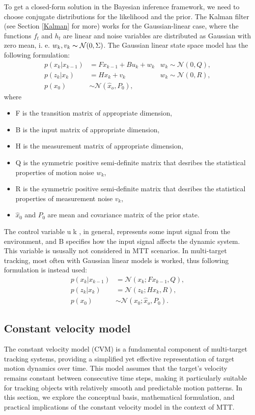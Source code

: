 To get a closed-form solution in the Bayesian inference framework, we need
to choose conjugate distributions for the likelihood and the prior. The Kalman filter (see Section \ref{Kalman} for
more) works for the Gaussian-linear case, where the functions
$f_t$ and $h_t$ are linear and noise variables are distributed as Gaussian with zero mean, i. e. $w_k, v_k  \thicksim \mathcal{N}(0,\Sigma)$. The Gaussian linear
state space model has the following formulation:
\begin{align}
    p(x_k|x_{k-1}) &= Fx_{k-1} + Bu_k + w_k
     &w_k \sim \mathcal{N}(0,Q),\\
    p(z_k|x_k) &= Hx_k + v_k
     &w_k \sim \mathcal{N}(0,R), \\
    p(x_0) &\sim \mathcal{N}(\hat{x}_o, P_0),
\end{align}
where
\begin{itemize}
    \item F is the transition matrix of appropriate dimension,
    \item B is the input matrix of appropriate dimension,
    \item H is the measurement matrix of appropriate dimension,
    \item Q is the symmetric positive semi-definite matrix that desribes the statistical properties of motion noise $
    w_k$,
    \item R is the symmetric positive semi-definite matrix that desribes the statistical properties of measurement
    noise $v_k$,
    \item $\hat{x}_0$ and $P_0$ are mean and covariance matrix of the prior state.
\end{itemize}
The control variable u k , in general, represents some input signal from the environment, and
B specifies how the input signal affects the dynamic system. This variable is ususally not considered in MTT scenarios.
In multi-target tracking, most often with Gaussian linear models is worked, thus following formulation is instead used:
\begin{align}
    p(x_k|x_{k-1}) &= \mathcal{N}(x_k; Fx_{k-1}, Q),  \\
    p(z_k|x_k) &= \mathcal{N}(z_k;Hx_k,R), \\
    p(x_0) &\sim \mathcal{N}(x_0;\hat{x}_o, P_0).
\end{align}


    \subsection{Constant velocity model}
The constant velocity model (CVM) is a fundamental component of multi-target tracking systems, providing a simplified yet effective representation of target motion dynamics over time. This model assumes that the target's velocity remains constant between consecutive time steps, making it particularly suitable for tracking objects with relatively smooth and predictable motion patterns. In this section, we explore the conceptual basis, mathematical formulation, and practical implications of the constant velocity model in the context of MTT.

